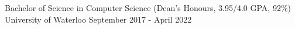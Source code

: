 
\begin{cventries}
  \cventry
    {Bachelor of Science in Computer Science (Dean's Honours, 3.95/4.0 GPA, 92\%)} %
    {University of Waterloo} %
    {} %
    {September 2017 - April 2022} %
    {
    }
\end{cventries}
